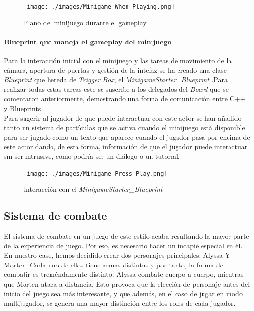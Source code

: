 \begin{figure}[H]
  \centering
  \texttt{[image: ./images/Minigame\_When\_Playing.png]}
  \caption{Plano del minijuego durante el gameplay}
  \label{GameplayMinigame}
\end{figure}

\paragraph{Blueprint que maneja el gameplay del minijuego}
Para la interacción inicial con el minijuego y las tareas de movimiento de la cámara, apertura de puertas y gestión de la intefaz se ha creado una clase \textit{Blueprint} que hereda de \textit{Trigger Box}, el \textit{MinigameStarter\_Blueprint} .Para realizar todas estas tareas este se suscribe a los delegados del \textit{Board} que se comentaron anteriormente, demostrando una forma de comunicación entre C++ y Blueprints. \\

Para sugerir al jugador de que puede interactuar con este actor se han añadido tanto un sistema de partículas que se activa cuando el minijuego está disponible para ser jugado como un texto que aparece cuando el jugador pasa por encima de este actor dando, de esta forma, información de que el jugador puede interactuar sin ser intrusivo, como podría ser un diálogo o un tutorial.


\begin{figure}[H]
  \centering
  \texttt{[image: ./images/Minigame\_Press\_Play.png]}
  \caption{Interacción con el \textit{MinigameStarter_Blueprint}}
  \label{Minigamestarterinteraction}
\end{figure}

\subsection{Sistema de combate}
El sistema de combate en un juego de este estilo acaba resultando la mayor parte de la experiencia de juego. Por eso, es necesario hacer un incapié especial en él.
En nuestro caso, hemos decidido crear dos personajes principales: Alyssa Y Morten. Cada uno de ellos tiene armas distintas y por tanto, la forma de combatir es treméndamente distinto: Alyssa combate cuerpo a cuerpo, mientras que Morten ataca a distancia. Esto provoca que la elección de personaje antes del inicio del juego sea más interesante, y que además, en el caso de jugar en modo multijugador, se genera una mayor distinción entre los roles de cada jugador. 


